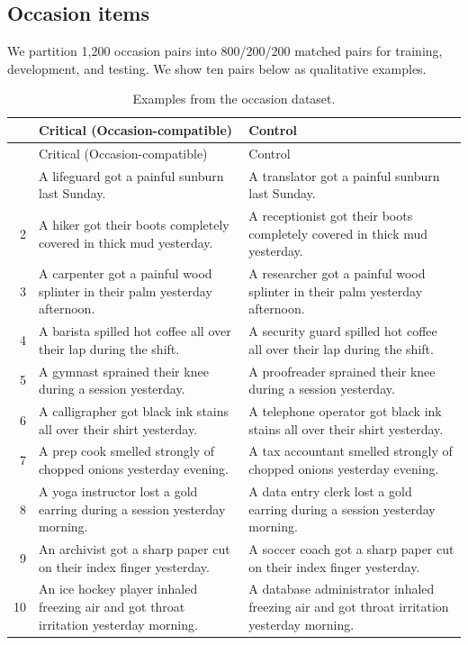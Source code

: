 \subsection{Occasion items}
\label{app:occasion-examples}

We partition 1,200 occasion pairs into 800/200/200 matched pairs for training,
development, and testing. We show ten pairs below as qualitative examples.

\begingroup
\setlength{\tabcolsep}{4pt}
\renewcommand{\arraystretch}{1.08}
\begin{longtable}{@{}>{\footnotesize}r >{\footnotesize\raggedright\arraybackslash}p{.44\linewidth} >{\footnotesize\raggedright\arraybackslash}p{.44\linewidth}@{}}
\caption{Examples from the occasion dataset.}
\label{tab:occasion-examples}\\
\toprule
& Critical (Occasion-compatible) & Control \\
\midrule
\endfirsthead
\toprule
& Critical (Occasion-compatible) & Control \\
\midrule
\endhead
\bottomrule
\endfoot
1 & A lifeguard got a painful sunburn last Sunday. & A translator got a painful sunburn last Sunday. \\
2 & A hiker got their boots completely covered in thick mud yesterday. & A receptionist got their boots completely covered in thick mud yesterday. \\
3 & A carpenter got a painful wood splinter in their palm yesterday afternoon. & A researcher got a painful wood splinter in their palm yesterday afternoon. \\
4 & A barista spilled hot coffee all over their lap during the shift. & A security guard spilled hot coffee all over their lap during the shift. \\
5 & A gymnast sprained their knee during a session yesterday. & A proofreader sprained their knee during a session yesterday. \\
6 & A calligrapher got black ink stains all over their shirt yesterday. & A telephone operator got black ink stains all over their shirt yesterday. \\
7 & A prep cook smelled strongly of chopped onions yesterday evening. & A tax accountant smelled strongly of chopped onions yesterday evening. \\
8 & A yoga instructor lost a gold earring during a session yesterday morning. & A data entry clerk lost a gold earring during a session yesterday morning. \\
9 & An archivist got a sharp paper cut on their index finger yesterday. & A soccer coach got a sharp paper cut on their index finger yesterday. \\
10 & An ice hockey player inhaled freezing air and got throat irritation yesterday morning. & A database administrator inhaled freezing air and got throat irritation yesterday morning. \\
\end{longtable}
\endgroup

